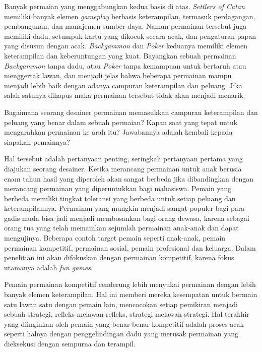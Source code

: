 Banyak permaian yang menggabungkan kedua basis di atas. \textit{Settlers of Catan} memiliki banyak elemen \textit{gameplay} berbasis keterampilan, termasuk perdagangan, pembangunan, dan manajemen sumber daya. Namun permainan tersebut juga memiliki dadu, setumpuk kartu yang dikocok secara acak, dan pengaturan papan yang disusun dengan acak. \textit{Backgammon} dan \textit{Poker} keduanya memiliki elemen keterampilan dan keberuntungan yang kuat. Bayangkan sebuah permainan \textit{Backgammon} tanpa dadu, atau \textit{Poker} tanpa kemampuan untuk bertaruh atau menggertak lawan, dan menjadi jelas bahwa beberapa permainan mampu menjadi lebih baik dengan adanya campuran keterampilan dan peluang. Jika salah satunya dihapus maka permainan tersebut tidak akan menjadi menarik.
\vspace{1ex}

Bagaimana seorang desainer permainan memasukkan campuran keterampilan dan peluang yang benar dalam sebuah permaian? Kapan saat yang tepat untuk mengarahkan permainan ke arah itu? Jawabannya adalah kembali kepada siapakah pemainnya?
\vspace{1ex}

Hal tersebut adalah pertanyaan penting, seringkali pertanyaan pertama yang diajukan seorang desainer. Ketika merancang permainan untuk anak berusia enam tahun hasil yang diperoleh akan sangat berbeda jika dibandingkan dengan merancang permainan yang diperuntukkan bagi mahasiswa. Pemain yang berbeda memiliki tingkat toleransi yang berbeda untuk setiap peluang dan keterampilannya. Permainan yang mungkin menjadi sangat populer bagi para gadis muda bisa jadi menjadi membosankan bagi orang dewasa, karena sebagai orang tua yang telah memainkan sejumlah permainan anak-anak dan dapat mengujinya. Beberapa contoh target pemain seperti anak-anak, pemain permainan kompetitif, permainan sosial, pemain profesional dan keluarga. Dalam penelitian ini akan difokuskan dengan permainan kompetitif, karena fokus utamanya adalah \textit{fun games}.
\vspace{1ex}

Pemain permainan kompetitif cenderung lebih menyukai permainan dengan lebih banyak elemen keterampilan. Hal ini memberi mereka kesempatan untuk bermain satu lawan satu dengan pemain lain, mencocokan setiap pemikiran menjadi sebuah strategi, refleks melawan refleks, strategi melawan strategi. Hal terakhir yang diinginkan oleh pemain yang benar-benar kompetitif adalah proses acak seperti halnya dengan penggelindingan dadu yang merusak permainan yang dieksekusi dengan sempurna dan terampil.
\vspace{1ex}

